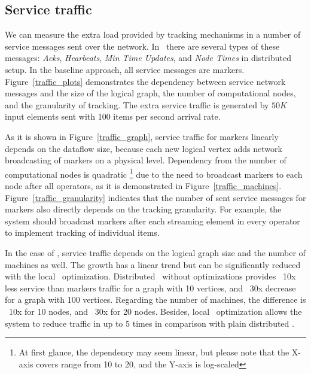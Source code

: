 \subsection{Service traffic}
\label{exp_network_traffic}
We can measure the extra load provided by tracking mechanisms in a number of service messages sent over the network. In \tracker\ there are several types of these messages: {\em Acks}, {\em Hearbeats}, {\em Min Time Updates}, and {\em Node Times} in distributed setup. In the baseline approach, all service messages are markers. Figure~\ref{traffic_plots} demonstrates the dependency between service network messages and the size of the logical graph, the number of computational nodes, and the granularity of tracking. The extra service traffic is generated by $50K$ input elements sent with 100 items per second arrival rate. 

As it is shown in Figure~\ref{traffic_graph}, service traffic for markers linearly depends on the dataflow size, because each new logical vertex adds network broadcasting of markers on a physical level. Dependency from the number of computational nodes is quadratic \footnote{At first glance, the dependency may seem linear, but please note that the X-axis covers range from 10 to 20, and the Y-axis is log-scaled} due to the need to broadcast markers to each node after all operators, as it is demonstrated in Figure~\ref{traffic_machines}. Figure~\ref{traffic_granularity} indicates that the number of sent service messages for markers also directly depends on the tracking granularity. For example, the system should broadcast markers after each streaming element in every operator to implement tracking of individual items. 

In the case of \tracker , service traffic depends on the logical graph size and the number of machines as well. The growth has a linear trend but can be significantly reduced with the local \tracker\ optimization. Distributed \tracker\ without optimizations provides ~10x less service than markers traffic for a graph with 10 vertices, and ~30x decrease for a graph with 100 vertices. Regarding the number of machines, the difference is ~10x for 10 nodes, and ~30x for 20 nodes. Besides, local \tracker\ optimization allows the system to reduce traffic in up to 5 times in comparison with plain distributed \tracker .


